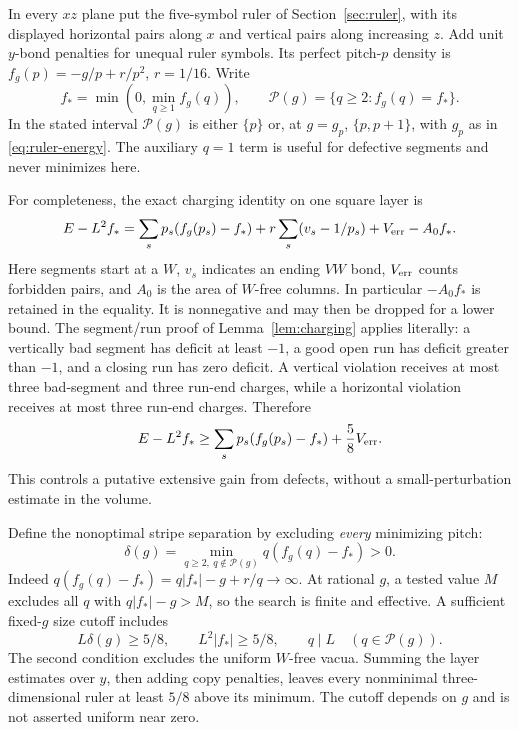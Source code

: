 In every $xz$ plane put the five-symbol ruler of
Section~\ref{sec:ruler}, with its displayed horizontal pairs along $x$
and vertical pairs along increasing $z$. Add unit $y$-bond penalties
for unequal ruler symbols. Its perfect pitch-$p$ density is
$f_g(p)=-g/p+r/p^2$, $r=1/16$. Write
\[
 f_* =\min(0,\min_{q\geq1}f_g(q)),\qquad
 \mathcal P(g)=\{q\geq2:f_g(q)=f_*\}.
\]
In the stated interval $\mathcal P(g)$ is either $\{p\}$ or, at
$g=g_p$, $\{p,p+1\}$, with $g_p$ as in
\eqref{eq:ruler-energy}. The auxiliary $q=1$ term is useful for
defective segments and never minimizes here.

For completeness, the exact charging identity on one square layer is
\begin{equation}\label{eq:bulk-defect-identity}
 E-L^2f_*=
 \sum_s p_s(f_g(p_s)-f_*)
 +r\sum_s(v_s-1/p_s)+V_{\rm err}-A_0f_*.
\end{equation}
Here segments start at a $W$, $v_s$ indicates an ending $VW$ bond,
$V_{\rm err}$ counts forbidden pairs, and $A_0$ is the area of
$W$-free columns. In particular $-A_0f_*$ is retained in the equality.
It is nonnegative and may then be dropped for a lower bound.
The segment/run proof of Lemma~\ref{lem:charging} applies literally:
a vertically bad segment has deficit at least $-1$, a good open run
has deficit greater than $-1$, and a closing run has zero deficit.
A vertical violation receives at most three bad-segment and three
run-end charges, while a horizontal violation receives at most three
run-end charges. Therefore
\begin{equation}\label{eq:bulk-defect-bound}
 E-L^2f_*\geq
 \sum_s p_s(f_g(p_s)-f_*)+\frac58 V_{\rm err}.
\end{equation}
This controls a putative extensive gain from defects, without a
small-perturbation estimate in the volume.

Define the nonoptimal stripe separation by excluding \emph{every}
minimizing pitch:
\[
 \delta(g)=\min_{q\geq2,\ q\notin\mathcal P(g)}
             q(f_g(q)-f_*)>0.
\]
Indeed $q(f_g(q)-f_*)=q|f_*|-g+r/q\to\infty$.
At rational $g$, a tested value $M$ excludes all $q$ with
$q|f_*|-g>M$, so the search is finite and effective. A sufficient
fixed-$g$ size cutoff includes
\begin{equation}\label{eq:bulk-classical-cutoff}
 L\delta(g)\geq5/8,\qquad L^2|f_*|\geq5/8,
 \qquad q\mid L\quad(q\in\mathcal P(g)).
\end{equation}
The second condition excludes the uniform $W$-free vacua. Summing the
layer estimates over $y$, then adding copy penalties, leaves every
nonminimal three-dimensional ruler at least $5/8$ above its minimum.
The cutoff depends on $g$ and is not asserted uniform near zero.

